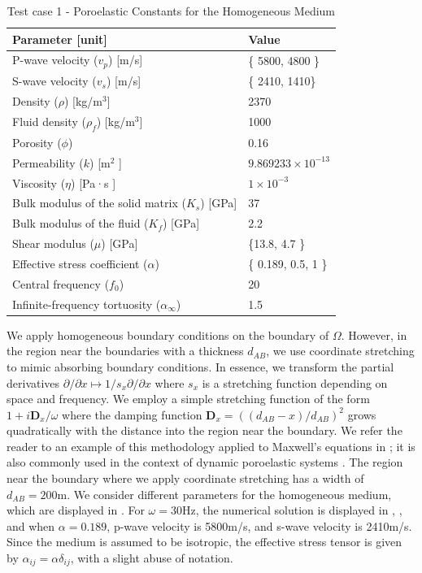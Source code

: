 \documentclass[pdflatex,sn-mathphys-num]{sn-jnl}
\theoremstyle{thmstyleone}%
\theoremstyle{thmstyletwo}%
\theoremstyle{thmstylethree}%
\theoremstyle{definition}
\begin{document}
		\begin{table}
		\renewcommand{\arraystretch}{1.1} 
		\centering
		\caption{Test case 1 - Poroelastic Constants for the Homogeneous Medium}
		\begin{tabular}{ll}
			\hline
			\textbf{Parameter} [unit] & \textbf{Value} \\ \hline
			P-wave velocity (\(v_p\)) [m/s] & \{ 5800, 4800 \} \\ 
			S-wave velocity (\(v_s\)) [m/s]& \{ 2410, 1410\}\\ 
			Density (\(\rho\)) [kg/m\(^3\)] & 2370  \\ 
			Fluid density (\(\rho_f\)) [kg/m\(^3\)]& 1000  \\ 
			Porosity (\(\phi\)) & 0.16 \\ 
			Permeability (\(k\)) [m\(^2\) ] & \(9.869233 \times 10^{-13}\) \\ 
			Viscosity (\(\eta\)) [Pa·s ] & \(1 \times 10^{-3}\) \\ 
			Bulk modulus of the solid matrix (\(K_s\)) [GPa]& 37  \\ 
			Bulk modulus of the fluid (\(K_f\)) [GPa] & 2.2  \\ 
			Shear modulus (\(\mu\)) [GPa]& \{13.8, 4.7  \}\\
			Effective stress coefficient (\(\alpha\)) & \{ 0.189, 0.5, 1 \}  \\ 
			Central frequency ($f_0$)& 20\\  
			Infinite-frequency tortuosity ($\alpha_{\infty}$) & 1.5 \\ \hline 
		\end{tabular}
		\label{tab:poroelastic_constants}
	\end{table}
	
	We apply homogeneous boundary conditions on the boundary of $\Omega$. However, in the region near the boundaries with a thickness $d_{AB}$, we use coordinate stretching to mimic absorbing boundary conditions. In essence, we transform the partial derivatives $\partial /\partial x\mapsto 1/s_x\partial /\partial x$ where $s_x$ is a stretching function depending on space and frequency. We employ a simple stretching function of the form $1+i\textbf{D}_x/\omega$ where the damping function $\textbf{D}_x=((d_{AB}-x)/d_{AB})^{2}$ grows quadratically with the distance into the region near the boundary. We refer the reader to an example of this methodology applied to Maxwell's equations in \cite{chew1997}; it is also commonly used in the context of dynamic poroelastic systems \cite{he2019}. The region near the boundary where we apply coordinate stretching has a width of $d_{AB}=200$m.
	We consider different parameters for the homogeneous medium, which are displayed in . For $\omega=30$Hz, the numerical solution is displayed in , , and  when $\alpha=0.189$, p-wave velocity is 5800m/s, and s-wave velocity is 2410m/s. Since the medium is assumed to be isotropic, the effective stress tensor is given by $\alpha _{ij} = \alpha \delta _{ij}$, with a slight abuse of notation. 
	
\end{document}
